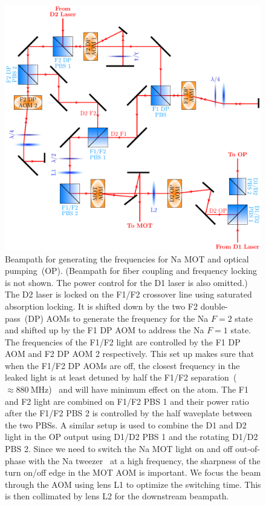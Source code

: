 \begin{figure}
  \centering
  \includegraphics[width=\textwidth]{figures/loading_na_res_beampath.pdf}
  \caption[Beampath for Na D1 and D2 light.]{
    Beampath for generating the frequencies for Na MOT and optical pumping~(OP).
    (Beampath for fiber coupling and frequency locking is not shown.
    The power control for the D1 laser is also omitted.)
    The D2 laser is locked on the F1/F2 crossover line using
    saturated absorption locking.
    It is shifted down by the two F2 double-pass~(DP) AOMs to generate the frequency
    for the Na $F=2$ state and shifted up by the F1 DP AOM to address the Na $F=1$ state.
    The frequencies of the F1/F2 light are controlled by the F1 DP AOM
    and F2 DP AOM 2 respectively.
    This set up makes sure that when the F1/F2 DP AOMs are off,
    the closest frequency in the leaked light is at least detuned
    by half the F1/F2 separation~($\approx\!880~\mathrm{MHz}$)~\cite{steck_sodium_2019}
    and will have minimum effect on the atom.
    The F1 and F2 light are combined on F1/F2 PBS 1 and their power ratio after the
    F1/F2 PBS 2 is controlled by the half waveplate between the two PBSs.
    A similar setup is used to combine the D1 and D2 light in the OP output using
    D1/D2 PBS 1 and the rotating D1/D2 PBS 2.
    Since we need to switch the Na MOT light on and off out-of-phase
    with the Na tweezer~\cite{hutzler_eliminating_2017} at a high frequency,
    the sharpness of the turn on/off edge in the MOT AOM is important.
    We focus the beam through the AOM using lens L1 to optimize the switching time.
    This is then collimated by lens L2 for the downstream beampath.
    \label{fig:loading:free-space:na-res-beampath}}
\end{figure}

